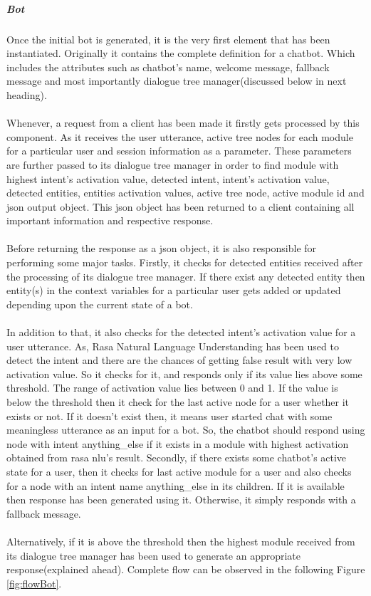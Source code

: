 \subparagraph*{Bot}
Once the initial bot is generated, it is the very first element that has been instantiated. Originally it contains the complete definition for a chatbot. Which includes the attributes such as chatbot's name, welcome message, fallback message and most importantly dialogue tree manager(discussed below in next heading).
\\~\\
Whenever, a request from a client has been made it firstly gets processed by this component. As it receives the user utterance, active tree nodes for each module for a particular user and session information as a parameter. These parameters are further passed to its dialogue tree manager in order to find module with highest intent's activation value, detected intent, intent's activation value, detected entities, entities activation values, active tree node, active module id and json output object. This json object has been returned to a client containing all important information and respective response.
\\~\\
Before returning the response as a json object, it is also responsible for performing some major tasks. Firstly, it checks for detected entities received after the processing of its dialogue tree manager. If there exist any detected entity then entity(s) in the context variables for a particular user gets added or updated depending upon the current state of a bot.
\\~\\
In addition to that, it also checks for the detected intent's activation value for a user utterance. As, Rasa Natural Language Understanding has been used to detect the intent and there are the chances of getting false result with very low activation value. So it checks for it, and responds only if its value lies above some threshold. The range of activation value lies between 0 and 1. If the value is below the threshold then it check for the last active node for a user whether it exists or not. If it doesn't exist then, it means user started chat with some meaningless utterance as an input for a bot. So, the chatbot should respond using node with intent anything\_else if it exists in a module with highest activation obtained from rasa nlu's result. Secondly, if there exists some chatbot's active state for a user, then it checks for last active module for a user and also checks for a node with an intent name anything\_else in its children. If it is available then response has been generated using it. Otherwise, it simply responds with a fallback message.
\\~\\
Alternatively, if it is above the threshold then the highest module received from its dialogue tree manager has been used to generate an appropriate response(explained ahead). Complete flow can be observed in the following Figure \ref{fig:flowBot}.

